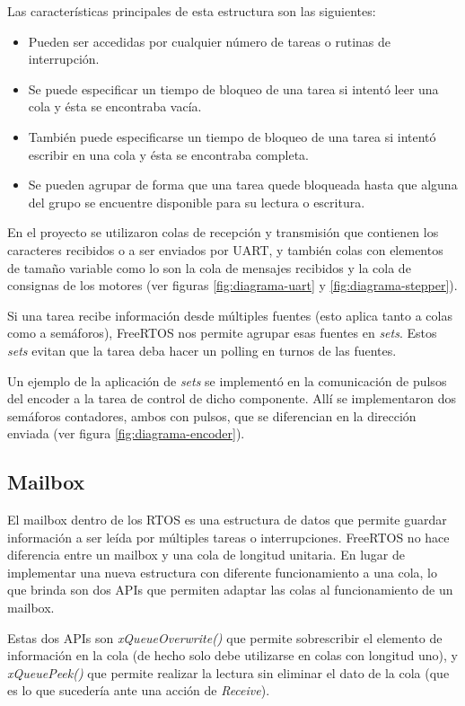\documentclass{IEEEtran}
\begin{document}
Las características principales de esta estructura son las siguientes:

\begin{itemize}
    \item Pueden ser accedidas por cualquier número de tareas o rutinas de interrupción.
    \item Se puede especificar un tiempo de bloqueo de una tarea si intentó leer una cola y ésta se encontraba vacía.
    \item También puede especificarse un tiempo de bloqueo de una tarea si intentó escribir en una cola y ésta se encontraba completa.
    \item Se pueden agrupar de forma que una tarea quede bloqueada hasta que alguna del grupo se encuentre disponible para su lectura o escritura.
\end{itemize}

En el proyecto se utilizaron colas de recepción y transmisión que contienen los caracteres recibidos o a ser enviados por UART, y también colas con elementos de tamaño variable como lo son la cola de mensajes recibidos y la cola de consignas de los motores (ver figuras \ref{fig:diagrama-uart} y \ref{fig:diagrama-stepper}).

Si una tarea recibe información desde múltiples fuentes (esto aplica tanto a colas como a semáforos), FreeRTOS nos permite agrupar esas fuentes en \textit{sets}. Estos \textit{sets} evitan que la tarea deba hacer un polling en turnos de las fuentes.

Un ejemplo de la aplicación de \textit{sets} se implementó en la comunicación de pulsos del encoder a la tarea de control de dicho componente. Allí se implementaron dos semáforos contadores, ambos con pulsos, que se diferencian en la dirección enviada (ver figura \ref{fig:diagrama-encoder}).

\subsection{Mailbox}
El mailbox dentro de los RTOS es una estructura de datos que permite guardar información a ser leída por múltiples tareas o interrupciones. FreeRTOS no hace diferencia entre un mailbox y una cola de longitud unitaria. En lugar de implementar una nueva estructura con diferente funcionamiento a una cola, lo que brinda son dos APIs que permiten adaptar las colas al funcionamiento de un mailbox.

Estas dos APIs son \textit{xQueueOverwrite()} que permite sobrescribir el elemento de información en la cola (de hecho solo debe utilizarse en colas con longitud uno), y \textit{xQueuePeek()} que permite realizar la lectura sin eliminar el dato de la cola (que es lo que sucedería ante una acción de \textit{Receive}).
\end{document}
